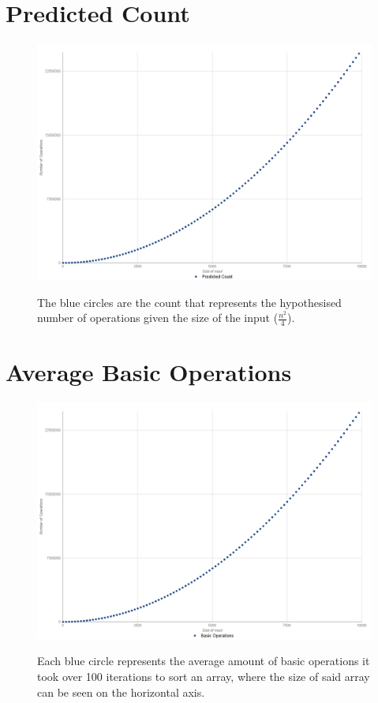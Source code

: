 \documentclass[12pt]{article}
\begin{document}
\begin{appendices}
\section{Predicted Count}
\begin{figure}[h]
	\includegraphics[scale=0.25]{predicted-count}\\[.1cm]
	\caption{\label{predicted-count}The blue circles are the count that represents the hypothesised number of operations given the size of the input  ($\frac{n^2}{4}$).}
\end{figure}
\newpage


\section{Average Basic Operations}
\begin{figure}[h]
	\centering
	\includegraphics[scale=0.2]{AverageBasicOperations}\\[.1cm]
	\caption{\label{AverageBasicOperations} Each blue circle represents the average amount of basic operations it took over 100 iterations to sort an array, where the size of said array can be seen on the horizontal axis.}
\end{figure}


\end{appendices}
\end{document}

